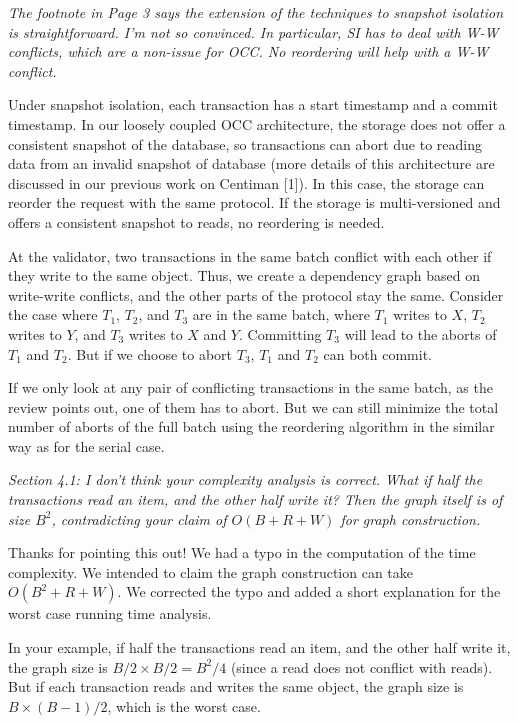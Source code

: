 \documentclass{article}
\begin{document}
\emph{The footnote in Page 3 says the extension of the techniques to snapshot isolation is straightforward. I'm not so convinced. In particular, SI has to deal with W-W conflicts, which are a non-issue for OCC. No reordering will help with a W-W conflict.
}

Under snapshot isolation, each transaction has a start timestamp and a commit timestamp. In our loosely coupled OCC architecture, the storage does not offer a consistent snapshot of the database, so transactions can abort due to reading data from an invalid snapshot of database (more details of this architecture are discussed in our previous work on Centiman [1]). In this case, the storage can reorder the request with the same protocol. If the storage is multi-versioned and offers a consistent snapshot to reads, no reordering is needed.

At the validator, two transactions in the same batch conflict with each other if they write to the same object. Thus, we create a dependency graph based on write-write conflicts, and the other parts of the protocol stay the same. Consider the case where $T_1$, $T_2$, and $T_3$ are in the same batch, where $T_1$ writes to $X$, $T_2$ writes to $Y$, and $T_3$ writes to $X$ and $Y$. Committing $T_3$ will lead to the aborts of $T_1$ and $T_2$. But if we choose to abort $T_3$, $T_1$ and $T_2$ can both commit.

If we only look at any pair of conflicting transactions in the same batch, as the review points out, one of them has to abort. But we can still minimize the total number of aborts of the full batch using the reordering algorithm in the similar way as for the serial case.

\emph{Section 4.1: I don't think your complexity analysis is correct. What if half the transactions read an item, and the other half write it? Then the graph itself is of size $B^2$, contradicting your claim of $O(B+R+W)$ for graph construction.}

Thanks for pointing this out! We had a typo in the computation of the time complexity. We intended to claim the graph construction can take $O(B^2+R+W)$. We corrected the typo and added a short explanation for the worst case running time analysis.

In your example, if half the transactions read an item, and the other half write it, the graph size is $B/2\times B/2=B^2/4$ (since a read does not conflict with reads). But if each transaction reads and writes the same object, the graph size is $B\times (B-1)/2$, which is the worst case.
\end{document}
